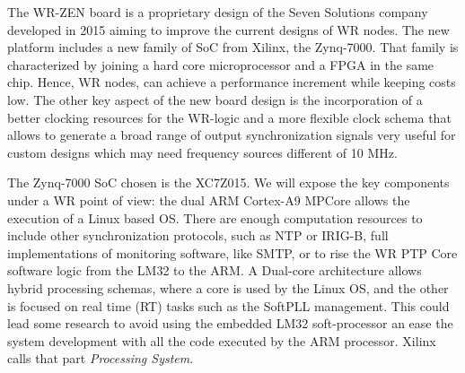 
The WR-ZEN board is a proprietary design of the Seven 
Solutions company developed in 2015 aiming to improve the current designs of WR nodes.
The new platform includes a new family of SoC from Xilinx, the Zynq-7000. That family is characterized by joining a hard core microprocessor and a FPGA in the same chip. Hence, WR nodes, can achieve a performance increment while keeping costs low. The other key aspect of the new board design is the incorporation of a better clocking resources for the WR-logic and a more flexible clock schema that allows to generate a broad range of output synchronization signals very useful for custom designs which may need frequency sources different of 10 MHz.

The Zynq-7000 SoC chosen is the XC7Z015. We will expose the 
key components under a WR point of view: the dual ARM Cortex-A9 MPCore allows the execution of a Linux based OS. There are enough computation resources to include other synchronization protocols, such as NTP or IRIG-B, full implementations of monitoring software, like SMTP, or to rise the WR PTP Core software logic from the LM32 to the ARM. A Dual-core architecture allows hybrid processing schemas, where a core is used by the Linux OS, and the other is focused on real time (RT) tasks such as the SoftPLL management. This could lead 
some research to avoid using the embedded LM32 soft-processor an ease the system development with all the code executed by the ARM processor. Xilinx calls that part \textit{Processing System}.

